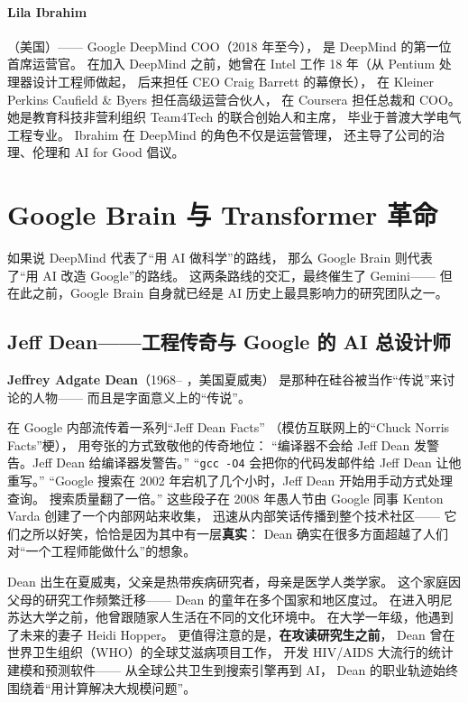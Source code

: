 \paragraph{Lila Ibrahim}（美国）——
Google DeepMind COO（2018 年至今），
是 DeepMind 的第一位首席运营官。
在加入 DeepMind 之前，她曾在 Intel 工作 18 年（从 Pentium 处理器设计工程师做起，
后来担任 CEO Craig Barrett 的幕僚长），
在 Kleiner Perkins Caufield \& Byers 担任高级运营合伙人，
在 Coursera 担任总裁和 COO。
她是教育科技非营利组织 Team4Tech 的联合创始人和主席，
毕业于普渡大学电气工程专业。
Ibrahim 在 DeepMind 的角色不仅是运营管理，
还主导了公司的治理、伦理和 AI for Good 倡议。


\section{Google Brain 与 Transformer 革命}
\label{sec:google-brain}

如果说 DeepMind 代表了``用 AI 做科学''的路线，
那么 Google Brain 则代表了``用 AI 改造 Google''的路线。
这两条路线的交汇，最终催生了 Gemini——
但在此之前，Google Brain 自身就已经是 AI 历史上最具影响力的研究团队之一。


\subsection{Jeff Dean——工程传奇与 Google 的 AI 总设计师}
\label{subsec:jeff-dean}

\noindent\textbf{Jeffrey Adgate Dean}（1968-- ，美国夏威夷）
是那种在硅谷被当作``传说''来讨论的人物——
而且是字面意义上的``传说''。

在 Google 内部流传着一系列``Jeff Dean Facts''
（模仿互联网上的``Chuck Norris Facts''梗），
用夸张的方式致敬他的传奇地位：
``编译器不会给 Jeff Dean 发警告。Jeff Dean 给编译器发警告。''
``\texttt{gcc -O4} 会把你的代码发邮件给 Jeff Dean 让他重写。''
``Google 搜索在 2002 年宕机了几个小时，Jeff Dean 开始用手动方式处理查询。
搜索质量翻了一倍。''
这些段子在 2008 年愚人节由 Google 同事 Kenton Varda 创建了一个内部网站来收集，
迅速从内部笑话传播到整个技术社区——
它们之所以好笑，恰恰是因为其中有一层\textbf{真实}：
Dean 确实在很多方面超越了人们对``一个工程师能做什么''的想象。

\begin{keybox}
Dean 出生在夏威夷，父亲是热带疾病研究者，母亲是医学人类学家。
这个家庭因父母的研究工作频繁迁移——
Dean 的童年在多个国家和地区度过。
在进入明尼苏达大学之前，他曾跟随家人生活在不同的文化环境中。
在大学一年级，他遇到了未来的妻子 Heidi Hopper。
更值得注意的是，\textbf{在攻读研究生之前}，
Dean 曾在世界卫生组织（WHO）的全球艾滋病项目工作，
开发 HIV/AIDS 大流行的统计建模和预测软件——
从全球公共卫生到搜索引擎再到 AI，
Dean 的职业轨迹始终围绕着``用计算解决大规模问题''。
\end{keybox}


